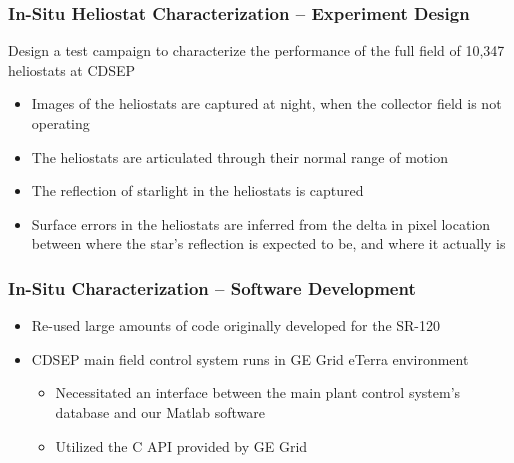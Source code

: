 \documentclass[aspectratio=169]{beamer}
\begin{document}
\begin{frame}
  \frametitle{In-Situ Heliostat Characterization -- Experiment Design}
  Design a test campaign to characterize the performance of the
  full field of 10,347 heliostats at CDSEP
  \begin{itemize}
  \item Images of the heliostats are captured at night, when the
    collector field is not operating
  \item The heliostats are articulated through their normal range of
    motion
  \item The reflection of starlight in the heliostats is captured
  \item Surface errors in the heliostats are inferred from the delta
    in pixel location between where the star's reflection is expected
    to be, and where it actually is
  \end{itemize}
\end{frame}

\begin{frame}
  \frametitle{In-Situ Characterization -- Software Development}
  \begin{itemize}
  \item Re-used large amounts of code originally developed for the SR-120
  \item CDSEP main field control system runs in GE Grid eTerra environment
    \begin{itemize}
    \item Necessitated an interface between the main plant control
      system's database and our Matlab software
    \item Utilized the C API provided by GE Grid
    \end{itemize}
  \end{itemize}
\end{frame}
\end{document}
